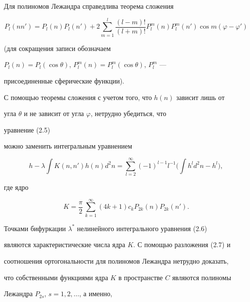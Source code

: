 Для полиномов Лежандра справедлива теорема сложения \cite{3}


$$


P_l(nn')=P_l(n)P_l(n')+


2\sum^l_{m=1}\frac{(l-m)!}{(l+m)!}P^m_l(n)P^m_l(n')


\cos m(\varphi-\varphi')


$$


(для сокращения записи обозначаем


$P_l(n)=P_l(\cos\theta)$, $P^m_l(n)=P^m_l(\cos\theta)$, $P^m_l$ ---


присоединенные сферические функции).





С помощью теоремы сложения с учетом того, что $h(n)$ зависит лишь от


угла $\theta$ и не зависит от угла $\varphi$, нетрудно убедиться, что


уравнение (2.5)


можно заменить интегральным уравнением


\begin{equation}


h-\lambda\int K(n,n')h(n)d^2n=\sum^\infty_{l=2}


(-1)^{l-1}l^{-1}\biggl(\int h^l d^2n-h^l \biggr),


\tag{2.6}


\end{equation}


где ядро


\begin{equation}


K=\frac{\pi}{2}\,\sum^\infty_{k=1}(4k+1)c_k P_{2k}(n)


P_{2k}(n').


\tag{2.7}


\end{equation}





Точками бифуркации $\lambda^*$ нелинейного интегрального уравнения (2.6)


являются характеристические числа ядра $K$. С помощью разложения (2.7) и


соотношения ортогональности для полиномов Лежандра нетрудно доказать,


что собственными функциями ядра $K$ в пространстве $C$ являются полиномы


Лежандра $P_{2s}$, $s=1,2,\dotsc$, а именно,


